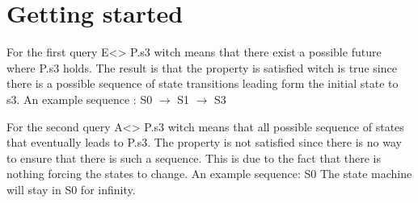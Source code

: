 \section{Getting started}
\label{sec:org7b4758c}

For the first query E<> P.s3 witch means that there exist a possible future where P.s3 holds. The result is that the property is satisfied witch is true since there is a possible sequence of state transitions leading form the initial state to s3.
An example sequence : S0 $\rightarrow$ S1 $\rightarrow$ S3

For the second query A<> P.s3 witch means that all possible sequence of states that eventually leads to P.s3. The property is not satisfied since there is no way to ensure that there is such a sequence. This is due to the fact that there is nothing forcing the states to change.
An example sequence: S0     The state machine will stay in S0 for infinity. 

